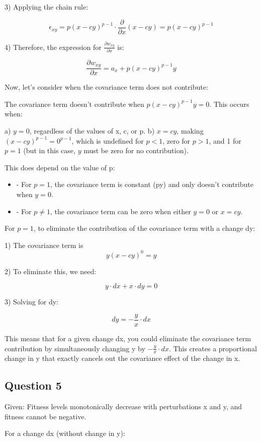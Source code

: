 \documentclass{article}
\begin{document}
3) Applying the chain rule:

   $$\epsilon_{xy} = p(x-cy)^{p-1} \cdot \frac{\partial}{\partial x}(x-cy) = p(x-cy)^{p-1}$$

4) Therefore, the expression for $\frac{\partial w_{xy}}{\partial x}$ is:

   $$\frac{\partial w_{xy}}{\partial x} = a_x + p(x-cy)^{p-1}y$$

Now, let's consider when the covariance term does not contribute:

The covariance term doesn't contribute when $p(x-cy)^{p-1}y = 0$. This occurs when:

a) $y = 0$, regardless of the values of x, c, or p.
b) $x = cy$, making $(x-cy)^{p-1} = 0^{p-1}$, which is undefined for $p < 1$, zero for $p > 1$, and 1 for $p = 1$ (but in this case, $y$ must be zero for no contribution).

This does depend on the value of p:
\begin{itemize}
    \item - For $p = 1$, the covariance term is constant (py) and only doesn't contribute when $y = 0$.
    \item - For $p \neq 1$, the covariance term can be zero when either $y = 0$ or $x = cy$.
\end{itemize}

For $p = 1$, to eliminate the contribution of the covariance term with a change dy:

1) The covariance term is $$y(x-cy)^0 = y$$

2) To eliminate this, we need:

   $$y \cdot dx + x \cdot dy = 0$$

3) Solving for dy:

   $$dy = -\frac{y}{x} \cdot dx$$

This means that for a given change dx, you could eliminate the covariance term contribution by simultaneously changing y by $-\frac{y}{x} \cdot dx$. This creates a proportional change in y that exactly cancels out the covariance effect of the change in x.

\subsection{Question 5}

Given: Fitness levels monotonically decrease with perturbations x and y, and fitness cannot be negative.

For a change dx (without change in y):
\end{document}

